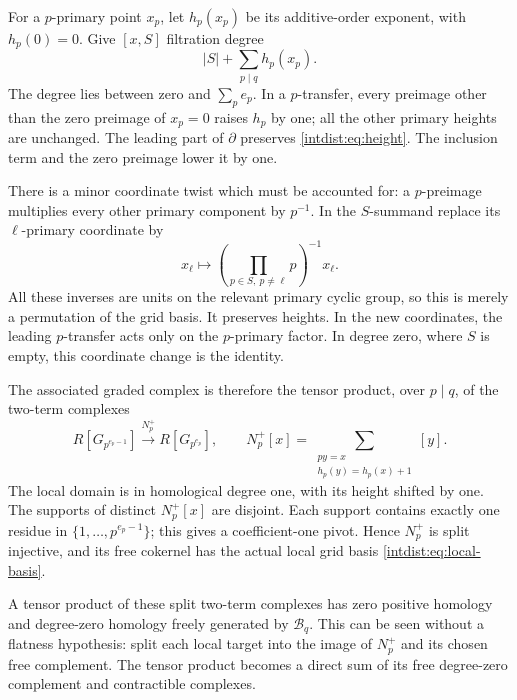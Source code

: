 For a $p$-primary point $x_p$, let $h_p(x_p)$ be its additive-order
exponent, with $h_p(0)=0$. Give $[x,S]$ filtration degree
\begin{equation}\label{intdist:eq:height}
 |S|+\sum_{p\mid q}h_p(x_p).
\end{equation}
The degree lies between zero and $\sum_pe_p$. In a $p$-transfer, every
preimage other than the zero preimage of $x_p=0$ raises $h_p$ by one;
all the other primary heights are unchanged. The leading part of
$\partial$ preserves \eqref{intdist:eq:height}. The inclusion term and
the zero preimage lower it by one.

There is a minor coordinate twist which must be accounted for: a
$p$-preimage multiplies every other primary component by $p^{-1}$.
In the $S$-summand replace its $\ell$-primary coordinate by
\[
 x_\ell\longmapsto
 \left(\prod_{p\in S,\ p\ne\ell}p\right)^{-1}x_\ell.
\]
All these inverses are units on the relevant primary cyclic group, so
this is merely a permutation of the grid basis. It preserves heights.
In the new coordinates, the leading $p$-transfer acts only on the
$p$-primary factor. In degree zero, where $S$ is empty, this coordinate
change is the identity.

The associated graded complex is therefore the tensor product, over
$p\mid q$, of the two-term complexes
\begin{equation}\label{intdist:eq:local-complex}
 R[G_{p^{e_p-1}}]\xrightarrow{N_p^+}R[G_{p^{e_p}}],
 \qquad
 N_p^+[x]=
 \sum_{\substack{py=x\\h_p(y)=h_p(x)+1}}[y].
\end{equation}
The local domain is in homological degree one, with its height shifted
by one. The supports of distinct $N_p^+[x]$ are disjoint. Each support
contains exactly one residue in $\{1,\ldots,p^{e_p-1}\}$; this gives a
coefficient-one pivot. Hence $N_p^+$ is split injective, and its free
cokernel has the actual local grid basis \eqref{intdist:eq:local-basis}.

A tensor product of these split two-term complexes has zero positive
homology and degree-zero homology freely generated by
$\mathcal B_q$. This can be seen without a flatness hypothesis: split
each local target into the image of $N_p^+$ and its chosen free
complement. The tensor product becomes a direct sum of its free
degree-zero complement and contractible complexes.

